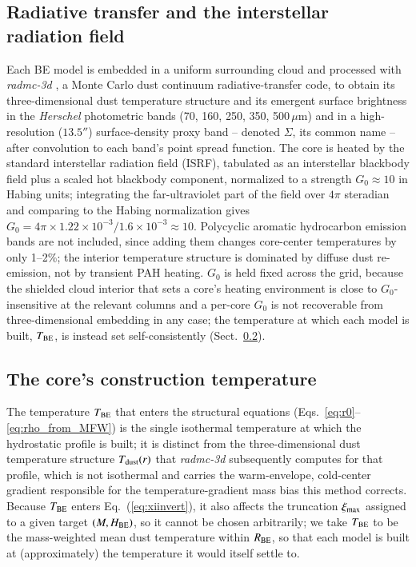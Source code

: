 \documentclass{aa}
\newcommand{\ximax}{\xi_{\rm max}}
\newcommand{\Tbe}{T_{\rm BE}}
\newcommand{\Rbe}{R_{\rm BE}}
\begin{document}
\subsection{Radiative transfer and the interstellar radiation field}
\label{sec:rt}

Each BE model is embedded in a uniform surrounding cloud and processed with
\emph{radmc-3d} \citep{Dullemond+2012}, a Monte Carlo dust continuum
radiative-transfer code, to obtain its three-dimensional dust temperature
structure and its emergent surface brightness in the \emph{Herschel} photometric
bands (70, 160, 250, 350, 500\,$\mu$m) and in a high-resolution
($13.5''$) surface-density proxy band -- denoted $\Sigma$, its common
name -- after convolution to each band's point spread function. The
core is heated by the standard interstellar radiation field (ISRF),
tabulated as an interstellar blackbody field plus a scaled hot blackbody
component, normalized to a strength $G_0 \approx 10$ in Habing units;
integrating the far-ultraviolet part of
the field over $4\pi$ steradian and comparing to the Habing normalization
gives $G_0 = 4\pi \times 1.22\times10^{-3}/1.6\times10^{-3} \approx 10$.
Polycyclic aromatic hydrocarbon emission bands are not included, since
adding them changes core-center temperatures by only 1--2\%; the interior
temperature structure is dominated by diffuse dust re-emission, not by
transient PAH heating. $G_0$ is held fixed across the grid, because the
shielded cloud interior that sets a core's heating environment is close to
$G_0$-insensitive at the relevant columns and a per-core $G_0$ is not
recoverable from three-dimensional embedding in any case; the temperature
at which each model is built, $\Tbe$, is instead set self-consistently
(Sect.~\ref{sec:tbe}).

\subsection{The core's construction temperature}
\label{sec:tbe}

The temperature $\Tbe$ that enters the structural equations
(Eqs.~\ref{eq:r0}--\ref{eq:rho_from_MFW}) is the single isothermal
temperature at which the hydrostatic profile is built; it is distinct from
the three-dimensional dust temperature structure $T_{\rm dust}(r)$
that \emph{radmc-3d} subsequently computes for that profile, which is not
isothermal and carries the warm-envelope, cold-center gradient responsible
for the temperature-gradient mass bias this method corrects. Because
$\Tbe$ enters Eq.~(\ref{eq:xiinvert}), it also affects the truncation
$\ximax$ assigned to a given target $(M,H_{\rm BE})$, so it
cannot be chosen arbitrarily; we take $\Tbe$ to be the mass-weighted mean
dust temperature within $\Rbe$, so that each model is built at
(approximately) the temperature it would itself settle to.
\end{document}
